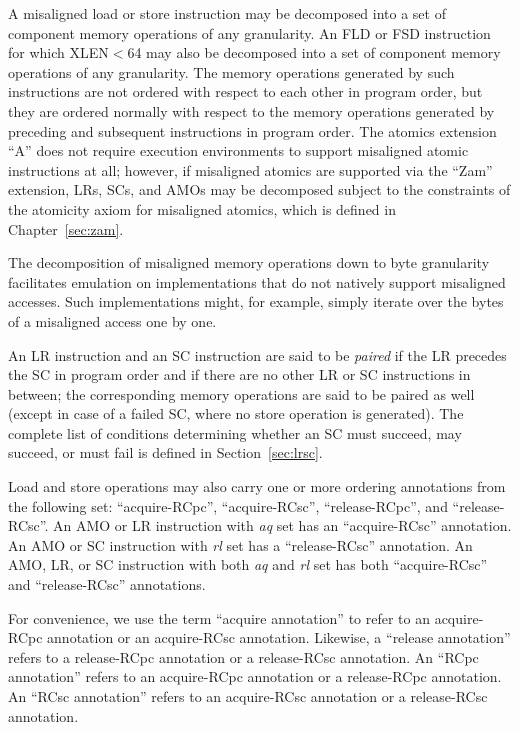 A misaligned load or store instruction may be decomposed into a set of component memory operations of any granularity.
An FLD or FSD instruction for which XLEN$<$64 may also be decomposed into a set of component memory operations of any granularity.
The memory operations generated by such instructions are not ordered with respect to each other in program order, but they are ordered normally with respect to the memory operations generated by preceding and subsequent instructions in program order.
The atomics extension ``A'' does not require execution environments to support misaligned atomic instructions at all; however, if misaligned atomics are supported via the ``Zam'' extension, LRs, SCs, and AMOs may be decomposed subject to the constraints of the atomicity axiom for misaligned atomics, which is defined in Chapter~\ref{sec:zam}.

\begin{commentary}
  The decomposition of misaligned memory operations down to byte granularity facilitates emulation on implementations that do not natively support misaligned accesses.
  Such implementations might, for example, simply iterate over the bytes of a misaligned access one by one.
\end{commentary}

An LR instruction and an SC instruction are said to be {\em paired} if the LR precedes the SC in program order and if there are no other LR or SC instructions in between; the corresponding memory operations are said to be paired as well (except in case of a failed SC, where no store operation is generated).
The complete list of conditions determining whether an SC must succeed, may succeed, or must fail is defined in Section~\ref{sec:lrsc}.

Load and store operations may also carry one or more ordering annotations from the following set: ``acquire-RCpc'', ``acquire-RCsc'', ``release-RCpc'', and ``release-RCsc''.
An AMO or LR instruction with {\em aq} set has an ``acquire-RCsc'' annotation.
An AMO or SC instruction with {\em rl} set has a ``release-RCsc'' annotation.
An AMO, LR, or SC instruction with both {\em aq} and {\em rl} set has both ``acquire-RCsc'' and ``release-RCsc'' annotations.

For convenience, we use the term ``acquire annotation'' to refer to an acquire-RCpc annotation or an acquire-RCsc annotation.
Likewise, a ``release annotation'' refers to a release-RCpc annotation or a release-RCsc annotation.
An ``RCpc annotation'' refers to an acquire-RCpc annotation or a release-RCpc annotation.
An ``RCsc annotation'' refers to an acquire-RCsc annotation or a release-RCsc annotation.

